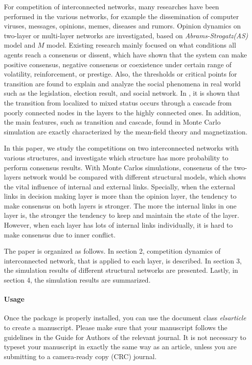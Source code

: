 \documentclass[review]{elsarticle}
\begin{document}
For competition of interconnected networks, many researches have been performed in the various networks, for example the dissemination of computer viruses, messages, opinions, memes, diseases and rumors\cite{hua2014,shenyu2018, zhou2018, alvarez2016,gomez2015,diep2017,rocca2014,velasquez2018}. Opinion dynamics on two-layer or multi-layer networks are investigated, based on \textit{Abrams-Strogatz(AS)} model\cite{abrams2003,vazquez2010} and $M$ model\cite{rocca2014}. Existing research mainly focused on what conditions all agents reach a consensus or dissent, which have shown that the system can make positive consensus, negative consensus or coexistence under certain range of volatility, reinforcement, or prestige. Also, the thresholds or critical points for transition are found to explain and analyze the social phenomena in real world such as the legislation, election result, and social network\cite{alvarez2016, amato2017, diep2017}. In \cite{gomez2015}, it is shown that the transition from localized to mixed status occurs through a cascade from poorly connected nodes in the layers to the highly connected ones. In addition, the main features, such as transition and cascade, found in Monte Carlo simulation are exactly characterized by the mean-field theory and magnetization\cite{alvarez2016, diep2017, amato2017, gomez2015}.   

In this paper, we study the competitions on two interconnected networks with various structures, and investigate which structure has more probability to perform consensus results. With Monte Carlos simulations, consensus of the two-layers network would be compared with different structural models, which shows the vital influence of internal and external links. Specially, when the external links in decision making layer is more than the opinion layer, the tendency to make consensus on both layers is stronger. The more the internal links in one layer is, the stronger the tendency to keep and maintain the state of the layer. However, when each layer has lots of internal links individually, it is hard to make consensus due to inner conflict.    

The paper is organized as follows. In section 2, competition dynamics of interconnected network, that is applied to each layer, is described. In section 3, the simulation results of different structural networks are presented. Lastly, in section 4, the simulation results are summarized.


\paragraph{Usage} Once the package is properly installed, you can use the document class \emph{elsarticle} to create a manuscript. Please make sure that your manuscript follows the guidelines in the Guide for Authors of the relevant journal. It is not necessary to typeset your manuscript in exactly the same way as an article, unless you are submitting to a camera-ready copy (CRC) journal.
\end{document}
